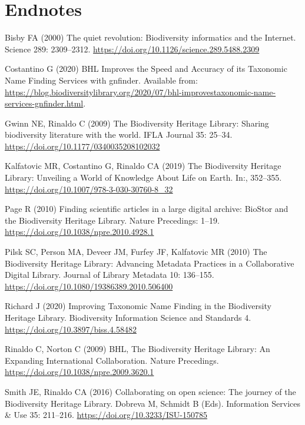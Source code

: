 \documentclass[
]{article}
\newlength{\cslhangindent}
\newlength{\cslentryspacingunit} %
\newenvironment{CSLReferences}[2] %
 {%
  \setlength{\parindent}{0pt}
  \ifodd #1
  \let\oldpar\par
  \def\par{\hangindent=\cslhangindent\oldpar}
  \fi
  \setlength{\parskip}{#2\cslentryspacingunit}
 }%
 {}
\begin{document}
\hypertarget{endnotes}{%
\section*{Endnotes}\label{endnotes}}

\hypertarget{refs}{}
\begin{CSLReferences}{1}{0}
\leavevmode{}%
Bisby FA (2000) {The quiet revolution: Biodiversity informatics and the
Internet}. Science 289: 2309--2312.
\url{https://doi.org/10.1126/science.289.5488.2309}

\leavevmode{}%
Costantino G (2020) {BHL Improves the Speed and Accuracy of its
Taxonomic Name Finding Services with gnfinder}. Available from:
\url{https://blog.biodiversitylibrary.org/2020/07/bhl-improvestaxonomic-name-services-gnfinder.html}.

\leavevmode{}%
Gwinn NE, Rinaldo C (2009) {The Biodiversity Heritage Library: Sharing
biodiversity literature with the world}. IFLA Journal 35: 25--34.
\url{https://doi.org/10.1177/0340035208102032}

\leavevmode{}%
Kalfatovic MR, Costantino G, Rinaldo CA (2019) {The Biodiversity
Heritage Library: Unveiling a World of Knowledge About Life on Earth}.
In:, 352--355. \url{https://doi.org/10.1007/978-3-030-30760-8_32}

\leavevmode{}%
Page R (2010) {Finding scientific articles in a large digital archive:
BioStor and the Biodiversity Heritage Library}. Nature Precedings:
1--19. \url{https://doi.org/10.1038/npre.2010.4928.1}

\leavevmode{}%
Pilsk SC, Person MA, Deveer JM, Furfey JF, Kalfatovic MR (2010) {The
Biodiversity Heritage Library: Advancing Metadata Practices in a
Collaborative Digital Library}. Journal of Library Metadata 10:
136--155. \url{https://doi.org/10.1080/19386389.2010.506400}

\leavevmode{}%
Richard J (2020) {Improving Taxonomic Name Finding in the Biodiversity
Heritage Library}. Biodiversity Information Science and Standards 4.
\url{https://doi.org/10.3897/biss.4.58482}

\leavevmode{}%
Rinaldo C, Norton C (2009) {BHL, The Biodiversity Heritage Library: An
Expanding International Collaboration}. Nature Precedings.
\url{https://doi.org/10.1038/npre.2009.3620.1}

\leavevmode{}%
Smith JE, Rinaldo CA (2016) {Collaborating on open science: The journey
of the Biodiversity Heritage Library}. Dobreva M, Schmidt B (Eds).
Information Services \& Use 35: 211--216.
\url{https://doi.org/10.3233/ISU-150785}

\end{CSLReferences}
\end{document}
